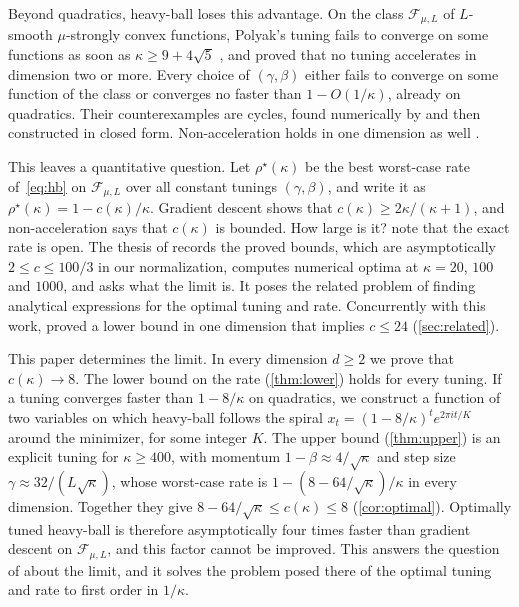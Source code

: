 \documentclass[11pt, a4paper]{article}
\theoremstyle{definition}
\newcommand{\F}{\mathcal{F}_{\mu,L}}
\begin{document}
Beyond quadratics, heavy-ball loses this advantage. On the class $\F$ of $L$-smooth $\mu$-strongly convex functions,
Polyak's tuning fails to converge on some functions as soon as $\kappa\ge9+4\sqrt5$
\citep[Thm.~2.2]{pasechniuk2026two}, and \citet{goujaud2025provable} proved that no tuning accelerates in
dimension two or more. Every choice of $(\gamma,\beta)$ either fails to converge on some function of the class or
converges no faster than $1-O(1/\kappa)$, already on quadratics. Their counterexamples are cycles, found numerically by
\citet{goujaud2023counter} and then constructed in closed form. Non-acceleration holds in one dimension as well
\citep{fotopoulos2026cycling,liu2026sharp}.

This leaves a quantitative question. Let $\rho^\star(\kappa)$ be the best worst-case rate of~\eqref{eq:hb} on $\F$ over
all constant tunings $(\gamma,\beta)$, and write it as $\rho^\star(\kappa)=1-c(\kappa)/\kappa$. Gradient descent shows
that $c(\kappa)\ge2\kappa/(\kappa+1)$, and non-acceleration says that $c(\kappa)$ is bounded. How large is it?
 note that the exact rate is open. The thesis of \citet[§10.3.3]{goujaud2024thesis}
records the proved bounds, which are asymptotically $2\le c\le100/3$ in our normalization, computes numerical optima at
$\kappa=20$, $100$ and $1000$, and asks what the limit is. It poses the related problem of finding analytical expressions
for the optimal tuning and rate. Concurrently with this work, \citet[App.~F]{liu2026sharp} proved a lower bound in one dimension that implies
$c\le24$ (\cref{sec:related}).

This paper determines the limit. In every dimension $d\ge2$ we prove that $c(\kappa)\to8$. The lower bound on the rate
(\cref{thm:lower}) holds for every tuning. If a tuning converges faster than $1-8/\kappa$ on quadratics, we construct a
function of two variables on which heavy-ball follows the spiral $x_t=(1-8/\kappa)^te^{2\pi it/K}$ around the
minimizer, for some integer $K$. The upper bound (\cref{thm:upper}) is an explicit tuning for $\kappa\ge400$, with
momentum $1-\beta\approx4/\sqrt\kappa$ and step size $\gamma\approx32/(L\sqrt\kappa)$, whose worst-case rate is
$1-(8-64/\sqrt\kappa)/\kappa$ in every dimension. Together they give $8-64/\sqrt\kappa\le c(\kappa)\le8$
(\cref{cor:optimal}). Optimally tuned heavy-ball is therefore asymptotically four times faster than gradient descent on
$\F$, and this factor cannot be improved. This answers the question of \citet{goujaud2024thesis} about the limit, and it
solves the problem posed there of the optimal tuning and rate to first order in $1/\kappa$.
\end{document}
